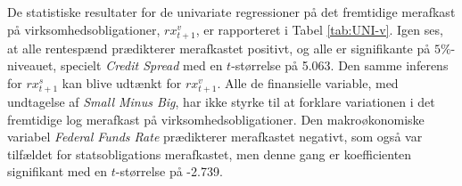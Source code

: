 \documentclass[
  a4paper,
  oneside]{memoir}
\begin{document}
De statistiske resultater for de univariate regressioner på det fremtidige merafkast på virksomhedsobligationer, \(rx_{t+1}^v\), er rapporteret i Tabel \ref{tab:UNI-v}. Igen ses, at alle rentespænd prædikterer merafkastet positivt, og alle er signifikante på \(5\%\)-niveauet, specielt \emph{Credit Spread} med en \(t\)-størrelse på 5.063. Den samme inferens for \(rx_{t+1}^s\) kan blive udtænkt for \(rx_{t+1}^v\). Alle de finansielle variable, med undtagelse af \emph{Small Minus Big}, har ikke styrke til at forklare variationen i det fremtidige log merafkast på virksomhedsobligationer. Den makroøkonomiske variabel \emph{Federal Funds Rate} prædikterer merafkastet negativt, som også var tilfældet for statsobligations merafkastet, men denne gang er koefficienten signifikant med en \(t\)-størrelse på -2.739.

\begin{table}[H]


\end{table}
\end{document}
